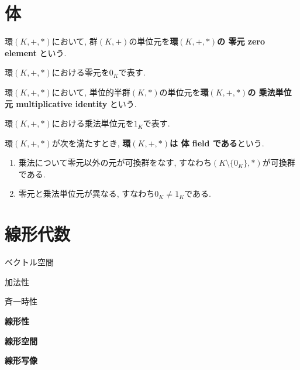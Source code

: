 \section{体}
\begin{Def}
環$(K,+,*)$において,
群$(K,+)$の単位元を{\bf 環$(K,+,*)$の
零元 zero element
}という.
\end{Def}
\begin{Notation}
環$(K,+,*)$における零元を$0_K$で表す.
\end{Notation}
\begin{Def}
環$(K,+,*)$において,
単位的半群$(K,*)$の単位元を{\bf 環$(K,+,*)$の
乗法単位元 multiplicative identity
}という.
\end{Def}
\begin{Notation}
環$(K,+,*)$における乗法単位元を$1_K$で表す.
\end{Notation}

\begin{Def}
環$(K,+,*)$が次を満たすとき, {\bf 環$(K,+,*)$は
体 field
である}という.
\begin{enumerate}
\item 乗法について零元以外の元が可換群をなす, すなわち$(K\setminus\{0_K\},*)$が可換群である.
\item 零元と乗法単位元が異なる, すなわち$0_K\neq 1_K$である.
\end{enumerate}
\end{Def}

\section{線形代数}
\begin{Def}
ベクトル空間
\end{Def}
\begin{Def}
加法性
\end{Def}
\begin{Def}
斉一時性
\end{Def}
\begin{Def}
{\bf 線形性}
\end{Def}
\begin{Def}
{\bf 線形空間}
\end{Def}
\begin{Def}
{\bf 線形写像}
\end{Def}